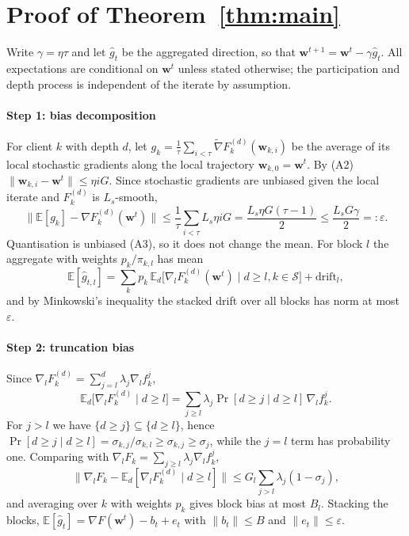 \section{Proof of Theorem~\ref{thm:main}}\label{app:proof}
Write $\gamma=\eta\tau$ and let $\hat g_t$ be the aggregated direction, so that $\mathbf w^{t+1}=\mathbf w^t-\gamma\hat g_t$. All expectations are conditional on $\mathbf w^t$ unless stated otherwise; the participation and depth process is independent of the iterate by assumption.

\paragraph{Step 1: bias decomposition}
For client $k$ with depth $d$, let $g_k=\frac1\tau\sum_{i<\tau}\tilde\nabla F_k^{(d)}(\mathbf w_{k,i})$ be the average of its local stochastic gradients along the local trajectory $\mathbf w_{k,0}=\mathbf w^t$. By (A2) $\|\mathbf w_{k,i}-\mathbf w^t\|\le\eta iG$. Since stochastic gradients are unbiased given the local iterate and $F_k^{(d)}$ is $L_s$-smooth,
\[
\big\|\mathbb E[g_k]-\nabla F_k^{(d)}(\mathbf w^t)\big\|\le\frac1\tau\sum_{i<\tau}L_s\eta iG=\frac{L_s\eta G(\tau-1)}2\le\frac{L_sG\gamma}2=:\varepsilon .
\]
Quantisation is unbiased (A3), so it does not change the mean. For block $l$ the aggregate with weights $p_k/\pi_{k,l}$ has mean
\[
\mathbb E[\hat g_{t,l}]=\sum_kp_k\,\mathbb E_d\big[\nabla_lF_k^{(d)}(\mathbf w^t)\mid d\ge l,k\in\mathcal S\big]+\mathrm{drift}_l ,
\]
and by Minkowski's inequality the stacked drift over all blocks has norm at most $\varepsilon$.

\paragraph{Step 2: truncation bias}
Since $\nabla_lF_k^{(d)}=\sum_{j=l}^{d}\lambda_j\nabla_lf_k^{j}$,
\[
\mathbb E_d\big[\nabla_lF_k^{(d)}\mid d\ge l\big]=\sum_{j\ge l}\lambda_j\Pr[d\ge j\mid d\ge l]\,\nabla_lf_k^{j}.
\]
For $j>l$ we have $\{d\ge j\}\subseteq\{d\ge l\}$, hence $\Pr[d\ge j\mid d\ge l]=\sigma_{k,j}/\sigma_{k,l}\ge\sigma_{k,j}\ge\sigma_j$, while the $j=l$ term has probability one. Comparing with $\nabla_lF_k=\sum_{j\ge l}\lambda_j\nabla_lf_k^{j}$,
\[
\Big\|\nabla_lF_k-\mathbb E_d[\nabla_lF_k^{(d)}\mid d\ge l]\Big\|\le G_l\sum_{j>l}\lambda_j(1-\sigma_j),
\]
and averaging over $k$ with weights $p_k$ gives block bias at most $B_l$. Stacking the blocks, $\mathbb E[\hat g_t]=\nabla F(\mathbf w^t)-b_t+e_t$ with $\|b_t\|\le B$ and $\|e_t\|\le\varepsilon$.

